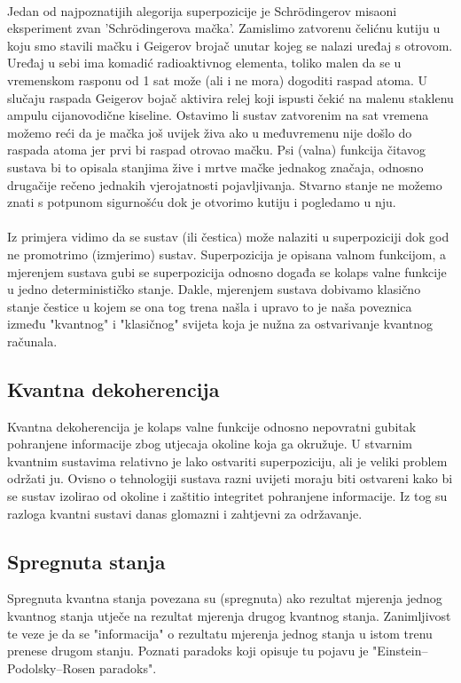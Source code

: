 \documentclass[times, utf8, zavrsni, numeric]{fer}
\begin{document}
\paragraph{}
Jedan od najpoznatijih alegorija superpozicije je Schr\"odingerov misaoni eksperiment zvan 'Schr\"odingerova mačka'. Zamislimo zatvorenu čelićnu kutiju u koju smo stavili mačku i Geigerov brojač unutar kojeg se nalazi uređaj s otrovom. Uređaj u sebi ima komadić radioaktivnog elementa, toliko malen da se u vremenskom rasponu od 1 sat može (ali i ne mora) dogoditi raspad atoma. U slučaju raspada Geigerov bojač aktivira relej koji ispusti čekić na malenu staklenu ampulu cijanovodične kiseline.
Ostavimo li sustav zatvorenim na sat vremena možemo reći da je mačka još uvijek živa ako u međuvremenu nije došlo do raspada atoma jer prvi bi raspad otrovao mačku. Psi (valna) funkcija čitavog sustava bi to opisala stanjima žive i mrtve mačke jednakog značaja, odnosno drugačije rečeno jednakih vjerojatnosti pojavljivanja.
Stvarno stanje ne možemo znati s potpunom sigurnošću dok je otvorimo kutiju i pogledamo u nju.

\paragraph{}
Iz primjera vidimo da se sustav (ili čestica) može nalaziti u superpoziciji dok god ne promotrimo (izmjerimo) sustav. Superpozicija je opisana valnom funkcijom, a mjerenjem sustava gubi se superpozicija odnosno događa se kolaps valne funkcije u jedno determinističko stanje. Dakle, mjerenjem sustava dobivamo klasično stanje čestice u kojem se ona tog trena našla i upravo to je naša poveznica između "kvantnog" i "klasičnog" svijeta koja je nužna za ostvarivanje kvantnog računala.

\subsection{Kvantna dekoherencija}
Kvantna dekoherencija je kolaps valne funkcije odnosno nepovratni gubitak pohranjene informacije zbog utjecaja okoline koja ga okružuje.
U stvarnim kvantnim sustavima relativno je lako ostvariti superpoziciju, ali je veliki problem održati ju. Ovisno o tehnologiji sustava razni uvijeti moraju biti ostvareni kako bi se sustav izolirao od okoline i zaštitio integritet pohranjene informacije. Iz tog su razloga kvantni sustavi danas glomazni i zahtjevni za održavanje.

\subsection{Spregnuta stanja }
Spregnuta kvantna stanja povezana su (spregnuta) ako rezultat mjerenja jednog kvantnog stanja utječe na rezultat mjerenja drugog kvantnog stanja. Zanimljivost te veze je da se "informacija" o rezultatu mjerenja jednog stanja u istom trenu prenese drugom stanju. Poznati paradoks koji opisuje tu pojavu je "Einstein–Podolsky–Rosen paradoks".
\end{document}
